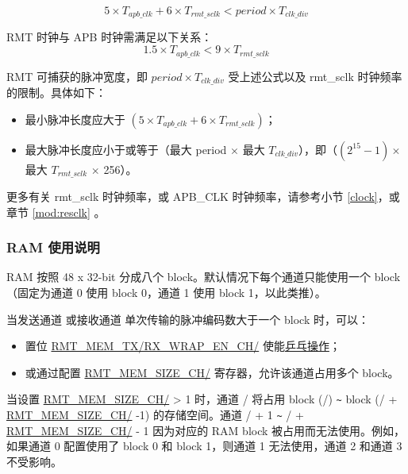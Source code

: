 \documentclass[main\_\_CN.tex]{subfiles}
\begin{document}
\begin{equation}\label{eq:rmt-period-value}
5 \times T_{apb\_clk} + 6 \times T_{rmt\_sclk} < period \times T_{clk\_div}
\end{equation}

\begin{tiplisting}
RMT 时钟与 APB 时钟需满足以下关系：
    \begin{equation}
    1.5 \times T_{apb\_clk} < 9 \times T_{rmt\_sclk}
    \end{equation}

RMT 可捕获的脉冲宽度，即 $period \times T_{clk\_div}$ 受上述公式以及 rmt\_sclk 时钟频率的限制。具体如下：

\begin{itemize}
    \item 最小脉冲长度应大于 $(5 \times T_{apb\_clk} + 6 \times T_{rmt\_sclk})$；
    \item 最大脉冲长度应小于或等于（最大 period $\times$ 最大 $T_{clk\_div}$），即（$(2^{15} - 1) \times$ 最大 $T_{rmt\_sclk}$ $\times$ 256）。
\end{itemize}

更多有关 rmt\_sclk 时钟频率，或 APB\_CLK 时钟频率，请参考小节 \ref{clock}，或章节 \ref{mod:resclk} \textit{}。
\end{tiplisting}

\subsubsection{RAM 使用说明}

RAM 按照 48 x 32-bit 分成八个 block。默认情况下每个通道只能使用一个 block（固定为通道 0 使用 block 0，通道 1 使用 block 1，以此类推）。

当发送通道  或接收通道  单次传输的脉冲编码数大于一个 block 时，可以：
\begin{itemize}
    \item 置位 \hyperref[fielddesc:RMTMEMTXWRAPENCHN]{RMT\_MEM\_TX/RX\_WRAP\_EN\_CH/} 使能\hyperref[sec:wrap-tx-mode]{乒乓操作}；
    \item 或通过配置 \hyperref[fielddesc:RMTMEMSIZECHN]{RMT\_MEM\_SIZE\_CH/} 寄存器，允许该通道占用多个 block。
\end{itemize}

当设置 \hyperref[fielddesc:RMTMEMSIZECHN]{RMT\_MEM\_SIZE\_CH/} > 1 时，通道 / 将占用 block (/) \verb+~+ block (/ + \hyperref[fielddesc:RMTMEMSIZECHN]{RMT\_MEM\_SIZE\_CH/} -1) 的存储空间。通道 / + 1 \verb+~+ / + \hyperref[fielddesc:RMTMEMSIZECHN]{RMT\_MEM\_SIZE\_CH/} - 1 因为对应的 RAM block 被占用而无法使用。例如，如果通道 0 配置使用了 block 0 和 block 1，则通道 1 无法使用，通道 2 和通道 3 不受影响。
\end{document}
